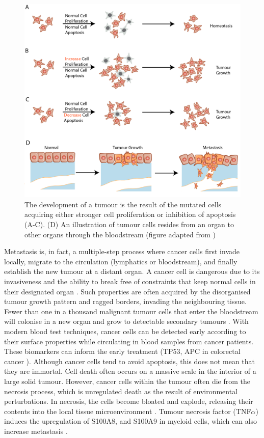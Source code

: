 \begin{figure}[htp]
    \centering
    \includegraphics[width=0.7\columnwidth]{Chapter1/Figures/Chap1_figure3.png}
    \caption[Tumorigenesis and metastasis process. ]{The development of a tumour is the result of the mutated cells acquiring either stronger cell proliferation or inhibition of apoptosis (A-C). (D) An illustration of tumour cells resides from an organ to other organs through the bloodstream (figure adapted from \cite{alberts2018molecular})}
    \label{fig:Chap1_figure3}
\end{figure}

Metastasis is, in fact, a multiple-step process where cancer cells first invade locally, migrate to the circulation (lymphatics or bloodstream), and finally establish the new tumour at a distant organ. A cancer cell is dangerous due to its invasiveness and the ability to break free of constraints that keep normal cells in their designated organ \cite{greaves2012clonal}. Such properties are often acquired by the disorganised tumour growth pattern and ragged borders, invading the neighbouring tissue. Fewer than one in a thousand malignant tumour cells that enter the bloodstream will colonise in a new organ and grow to detectable secondary tumours \cite{joyce2009microenvironmental}. With modern blood test techniques, cancer cells can be detected early according to their surface properties while circulating in blood samples from cancer patients. These biomarkers can inform the early treatment (\ie TP53, APC in colorectal cancer \cite{markowitz2009molecular}). Although cancer cells tend to avoid apoptosis, this does not mean that they are immortal. Cell death often occurs on a massive scale in the interior of a large solid tumour. However, cancer cells within the tumour often die from the necrosis process, which is unregulated death as the result of environmental perturbations. In necrosis, the cells become bloated and explode, releasing their contents into the local tissue microenvironment \cite{hanahan2011hallmarksnext}. Tumour necrosis factor (TNF$\alpha$) induces the upregulation of S100A8, and S100A9 in myeloid cells, which can also increase metastasis \cite{hiratsuka2008s100a8, hiratsuka2006tumour}. 

